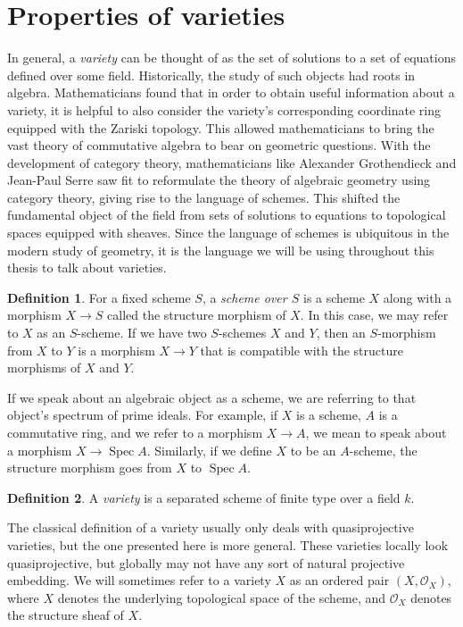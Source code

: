 \documentclass[12pt,twoside]{reedthesis}
\theoremstyle{plain}
\theoremstyle{definition}
\newtheorem{definition}{Definition}[section]
\theoremstyle{remark}
\newcommand{\calO}{\mathcal{O}}
\newcommand{\Spec}{\operatorname{Spec}}
\begin{document}
\section{Properties of varieties}
In general, a \emph{variety} can be thought of as the set of solutions to a set of equations defined over some field. Historically, the study of such objects had roots in algebra. Mathematicians found that in order to obtain useful information about a variety, it is helpful to also consider the variety's corresponding coordinate ring equipped with the Zariski topology. This allowed mathematicians to bring the vast theory of commutative algebra to bear on geometric questions. With the development of category theory, mathematicians like Alexander Grothendieck and Jean-Paul Serre saw fit to reformulate the theory of algebraic geometry using category theory, giving rise to the language of schemes. This shifted the fundamental object of the field from sets of solutions to equations to topological spaces equipped with sheaves. Since the language of schemes is ubiquitous in the modern study of geometry, it is the language we will be using throughout this thesis to talk about varieties.
\begin{definition}
For a fixed scheme $S$, a \emph{scheme over $S$} is a scheme $X$ along with a morphism $X\to S$ called the structure morphism of $X$. In this case, we may refer to $X$ as an $S$-scheme. If we have two $S$-schemes $X$ and $Y$, then an $S$-morphism from $X$ to $Y$ is a morphism $X\to Y$ that is compatible with the structure morphisms of $X$ and $Y$.\label{schemeOverDef}
\end{definition}
If we speak about an algebraic object as a scheme, we are referring to that object's spectrum of prime ideals. For example, if $X$ is a scheme, $A$ is a commutative ring, and we refer to a morphism $X\to A$, we mean to speak about a morphism $X\to\Spec A$. Similarly, if we define $X$ to be an $A$-scheme, the structure morphism goes from $X$ to $\Spec A$.
\begin{definition}
A \emph{variety} is a separated scheme of finite type over a field $k$. \label{varDef}
\end{definition}
\noindent The classical definition of a variety usually only deals with quasiprojective varieties, but the one presented here is more general. These varieties locally look quasiprojective, but globally may not have any sort of natural projective embedding. We will sometimes refer to a variety $X$ as an ordered pair $(X,\calO_X)$, where $X$ denotes the underlying topological space of the scheme, and $\calO_X$ denotes the structure sheaf of $X$. 
\end{document}
